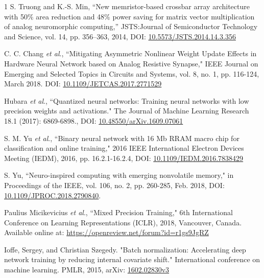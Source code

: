 \documentclass[journal]{IEEEtran}
\begin{document}
\begin{thebibliography}{1}
S. Truong and K.-S. Min, ``New memristor-based crossbar array architecture with 50$\%$ area reduction and 48$\%$ power saving for matrix vector multiplication of analog neuromorphic computing,” JSTS:Journal of Semiconductor Technology and Science, vol. 14, pp. 356–363, 2014, DOI: \href{https://www.dbpia.co.kr/journal/articleDetail?nodeId=NODE02501184}{10.5573/JSTS.2014.14.3.356}

C. C. Chang \emph{et al}., ``Mitigating Asymmetric Nonlinear Weight Update Effects in Hardware Neural Network based on Analog Resistive Synapse," IEEE Journal on Emerging and Selected Topics in Circuits and Systems, vol. 8, no. 1, pp. 116-124, March 2018. DOI: \href{https://ieeexplore.ieee.org/document/8101463}{10.1109/JETCAS.2017.2771529}

Hubara \emph{et al}., ``Quantized neural networks: Training neural networks with low precision weights and activations." The Journal of Machine Learning Research 18.1 (2017): 6869-6898., DOI: \href{https://doi.org/10.48550/arXiv.1609.07061}{10.48550/arXiv.1609.07061}

S. M. Yu \emph{et al}., ``Binary neural network with 16 Mb RRAM macro chip for classification and online training," 2016 IEEE International Electron Devices Meeting (IEDM), 2016, pp. 16.2.1-16.2.4, DOI: \href{https://ieeexplore.ieee.org/document/7838429}{10.1109/IEDM.2016.7838429}

S. Yu, ``Neuro-inspired computing with emerging nonvolatile memory," in Proceedings of the IEEE, vol. 106, no. 2, pp. 260-285, Feb. 2018, DOI: \href{https://ieeexplore.ieee.org/document/8267253}{10.1109/JPROC.2018.2790840}.

Paulius Micikevicius \emph{et al}., ``Mixed Precision Training," 6th International Conference on Learning Representations (ICLR), 2018, Vancouver, Canada. Available online at: \href{https://openreview.net/forum?id=r1gs9JgRZ}{https://openreview.net/forum?id=r1gs9JgRZ}

Ioffe, Sergey, and Christian Szegedy. "Batch normalization: Accelerating deep network training by reducing internal covariate shift." International conference on machine learning. PMLR, 2015, arXiv: \href{https://arxiv.org/abs/1602.02830v3}{1602.02830v3}


\end{thebibliography}
\end{document}
